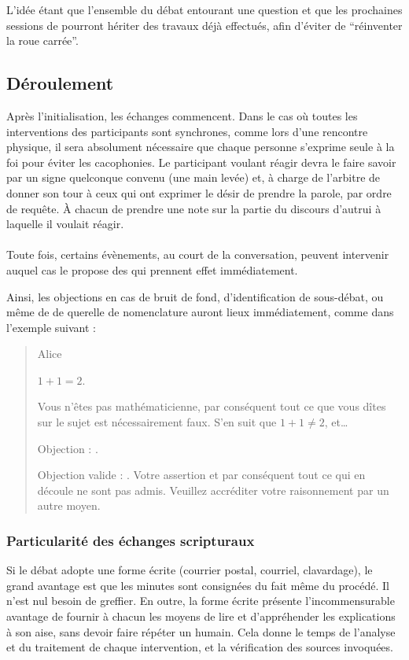L’idée étant que l’ensemble du débat entourant une question et que les prochaines sessions de \mainabbr{} pourront hériter des travaux déjà effectués, afin d’éviter de \enquote{réinventer la roue carrée}.
\subsection{Déroulement}
Après l’initialisation, les échanges commencent. Dans le cas où toutes les interventions des participants sont synchrones, comme lors d’une rencontre physique, il sera absolument nécessaire que chaque personne s’exprime seule à la foi pour éviter les cacophonies. Le participant voulant réagir devra le faire savoir par un signe quelconque convenu (une main levée) et, à charge de l’arbitre de donner son tour à ceux qui ont exprimer le désir de prendre la parole, par ordre de requête. À chacun de prendre une note sur la partie du discours d’autrui à laquelle il voulait réagir.

\paragraph{}
Toute fois, certains évènements, au court de la conversation, peuvent intervenir auquel cas le \mainabbr{} propose des  qui prennent effet immédiatement.

Ainsi, les objections en cas de bruit de fond, d’identification de sous-débat, ou même de de querelle de nomenclature auront lieux immédiatement, comme dans l’exemple suivant :
\begin{quote}
  \begin{drama}{0cm}{0cm}{Alice}

    \Aspeaks       $1+1=2$.

    \Bspeaks       Vous n’êtes pas mathématicienne, par conséquent tout ce que vous dîtes sur le sujet est nécessairement faux. S’en suit que $1+1\neq2$, et…

    \Aspeaks       Objection : .

    \Arbitrespeaks Objection valide : \B. Votre assertion et par conséquent tout ce qui en découle ne sont pas admis. Veuillez accréditer votre raisonnement par un autre moyen.

  \end{drama}
\end{quote}

\subsubsection{Particularité des échanges scripturaux}
Si le débat adopte une forme écrite (courrier postal, courriel, clavardage), le grand avantage est que les minutes sont consignées du fait même du procédé. Il n’est nul besoin de greffier. En outre, la forme écrite présente l’incommensurable avantage de fournir à chacun les moyens de lire et d’appréhender les explications à son aise, sans devoir faire répéter un humain. Cela donne le temps de l’analyse et du traitement de chaque intervention, et la vérification des sources invoquées.

